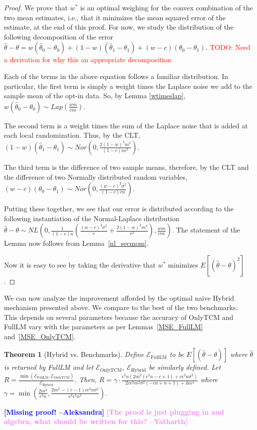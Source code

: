 \documentclass{article}
\newcommand{\ak}[1]{\textcolor{blue}{\bf\small [#1 --Aleksandra]}}
\newcommand{\yd}[1]{\textcolor{violet}{\bf\small [#1 --Yatharth]}}
\newcommand\TODO[1]{\textcolor{red}{TODO: {#1}}}
\theoremstyle{plain}
\newtheorem{thm}{Theorem}[section]
\begin{document}
\begin{proof}
We prove that $w^*$ is an optimal weighing for the convex combination of the two mean estimates, i.e., that it minimizes the mean squared error of the estimate, at the end of this proof. For now, we study the distribution of the following decomposition of the error
$\hat{\theta} - \theta = w(\hat{\theta}_0 - \theta_0) + (1-w)(\hat{\theta}_1 - \theta_1) + (w-c)(\theta_0 - \theta_1).$ \TODO{Need a derivation for why this an appropriate decomposition}

Each of the terms in the above equation follows a familiar distribution. In particular, the first term is simply a weight times the Laplace noise we add to the sample mean of the opt-in data. So, by Lemma \ref{wtimeslap},
$w(\hat{\theta}_0 - \theta_0) \sim Lap\left(\frac{wm}{cn\epsilon}\right).$

The second term is a weight times the sum of the Laplace noise that is added at each local randomization. Thus, by the CLT,
$(1-w)(\hat{\theta}_1 - \theta_1) \sim Nor\left(0, \frac{2(1-w)^2 m^2}{(1-c)n\epsilon^2}\right).$

The third term is the difference of two sample means, therefore, by the CLT and the difference of two Normally distributed random variables, 
$(w-c)(\theta_0 - \theta_1) \sim Nor\left(0, \frac{(w-c)^2\sigma^2}{(1-c)cn}\right).$

Putting these together, we see that our error is distributed according to the following instantiation of the Normal-Laplace distribution
$\hat{\theta} - \theta \sim NL\left(0, \frac{1}{(1-c)n}\left(\frac{(w-c)^2\sigma^2}{c} + \frac{2(1-w)^2 m^2}{\epsilon^2}\right), \frac{wm}{cn\epsilon}\right).$ The statement of the Lemma now follows from Lemma~\ref{nl_secmom}.

Now it is easy to see by taking the derivative that $w^*$ minimizes $E[(\hat{\theta} - \theta)^2]$.
\end{proof}

We can now analyze the improvement afforded by the optimal naive Hybrid mechanism presented above. We compare to the best of the two benchmarks. This depends on several parameters because the accuracy of OnlyTCM and FullLM vary with the parameters as per Lemmas~\ref{MSE_FullLM} and~\ref{MSE_OnlyTCM}. 

\begin{thm}[Hybrid vs. Benchmarks]\label{thm:main}
Define $\mathcal{E}_{\text{FullLM}}$ to be $E[(\hat{\theta} - \theta)]$ where $\hat{\theta}$ is returned by FullLM and let $\mathcal{E}_{\text{OnlyTCM}}$, $\mathcal{E}_{\text{Hybrid}}$ be similarly defined.
Let 
$R = \frac{\min(\mathcal{E}_{\text{FullLM}}, \mathcal{E}_{\text{OnlyTCM}})}{\mathcal{E}_{\text{Hybrid}}}$.
Then, 
$R = \gamma \cdot \frac{\epsilon^2 n \left(2 m^2 \left(c^2 n-c+1\right)+c \epsilon^2 n \sigma^2\right)}{2 c \epsilon^2 m^2 \sigma^2 (-c n+n+1)+4 m^4}$
where 
$\gamma = \min \left(\frac{2 m^2}{\epsilon^2 n},\frac{2 m^2-(c-1) c \epsilon^2 n \sigma^2}{c^2 \epsilon^2 n^2}\right).$
\end{thm}
\ak{Missing proof!} \yd{The proof is just plugging in and algebra, what should be written for this?}
\end{document}
